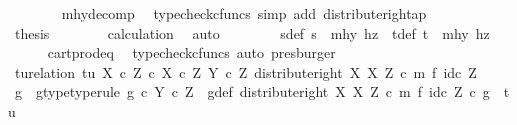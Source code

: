 \begin{isabellebody}
\ \ \ \ \ \ \isamarkupfalse%
\ mhy{\isacharunderscore}{\kern0pt}decomp\ \isamarkupfalse%
\ {\isacharparenleft}{\kern0pt}typecheck{\isacharunderscore}{\kern0pt}cfuncs{\isacharcomma}{\kern0pt}\ simp\ add{\isacharcolon}{\kern0pt}\ distribute{\isacharunderscore}{\kern0pt}right{\isacharunderscore}{\kern0pt}ap{\isacharparenright}{\kern0pt}\isanewline
\ \ \ \ \isamarkupfalse%
\ \isamarkupfalse%
\ {\isacharquery}{\kern0pt}thesis\isanewline
\ \ \ \ \ \ \isamarkupfalse%
\ calculation\ \isamarkupfalse%
\ auto\isanewline
\ \ \isamarkupfalse%
\isanewline
\ \ \isamarkupfalse%
\ \isamarkupfalse%
\ s{\isacharunderscore}{\kern0pt}def{\isacharcolon}{\kern0pt}\ {\isachardoublequoteopen}s\ {\isacharequal}{\kern0pt}\ {\isasymlangle}mhy{}{\isacharcomma}{\kern0pt}\ hz{\isasymrangle}{\isachardoublequoteclose}\ \ t{\isacharunderscore}{\kern0pt}def{\isacharcolon}{\kern0pt}\ {\isachardoublequoteopen}t\ {\isacharequal}{\kern0pt}\ {\isasymlangle}mhy{}{\isacharcomma}{\kern0pt}\ hz{\isasymrangle}{\isachardoublequoteclose}\isanewline
\ \ \ \ \isamarkupfalse%
\ cart{\isacharunderscore}{\kern0pt}prod{\isacharunderscore}{\kern0pt}eq{}\ \isamarkupfalse%
\ {\isacharparenleft}{\kern0pt}typecheck{\isacharunderscore}{\kern0pt}cfuncs{\isacharcomma}{\kern0pt}\ auto{\isacharcomma}{\kern0pt}\ presburger{\isacharparenright}{\kern0pt}\isanewline
\isanewline
\ \ \isamarkupfalse%
\ tu{\isacharunderscore}{\kern0pt}relation{\isacharcolon}{\kern0pt}\ {\isachardoublequoteopen}{\isasymlangle}t{\isacharcomma}{\kern0pt}u{\isasymrangle}\ {\isasymin}\isactrlbsub {\isacharparenleft}{\kern0pt}X\ {\isasymtimes}\isactrlsub c\ Z{\isacharparenright}{\kern0pt}\ {\isasymtimes}\isactrlsub c\ X\ {\isasymtimes}\isactrlsub c\ Z\isactrlesub \ {\isacharparenleft}{\kern0pt}Y\ {\isasymtimes}\isactrlsub c\ Z{\isacharcomma}{\kern0pt}\ distribute{\isacharunderscore}{\kern0pt}right\ X\ X\ Z\ {\isasymcirc}\isactrlsub c\ m\ {\isasymtimes}\isactrlsub f\ id\isactrlsub c\ Z{\isacharparenright}{\kern0pt}{\isachardoublequoteclose}\isanewline
\ \ \isamarkupfalse%
\ \isamarkupfalse%
\ g\ \ g{\isacharunderscore}{\kern0pt}type{\isacharbrackleft}{\kern0pt}type{\isacharunderscore}{\kern0pt}rule{\isacharbrackright}{\kern0pt}{\isacharcolon}{\kern0pt}\ {\isachardoublequoteopen}g\ {\isasymin}\isactrlsub c\ Y\ {\isasymtimes}\isactrlsub c\ Z{\isachardoublequoteclose}\ \ g{\isacharunderscore}{\kern0pt}def{\isacharcolon}{\kern0pt}\ {\isachardoublequoteopen}{\isacharparenleft}{\kern0pt}distribute{\isacharunderscore}{\kern0pt}right\ X\ X\ Z\ {\isasymcirc}\isactrlsub c\ m\ {\isasymtimes}\isactrlsub f\ id\isactrlsub c\ Z{\isacharparenright}{\kern0pt}\ {\isasymcirc}\isactrlsub c\ g\ {\isacharequal}{\kern0pt}\ {\isasymlangle}t{\isacharcomma}{\kern0pt}u{\isasymrangle}{\isachardoublequoteclose}\isanewline

\end{isabellebody}
